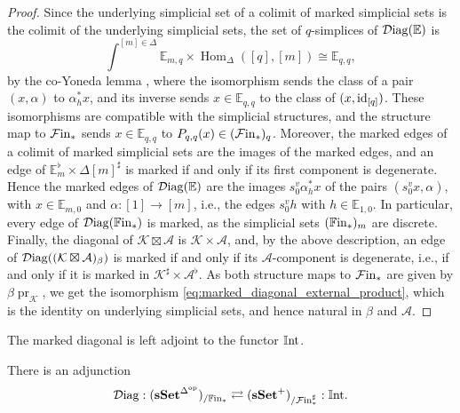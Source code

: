 \documentclass[10pt,reqno]{amsart}
\begin{document}
\begin{proof}
Since the underlying simplicial set of a colimit of marked simplicial
sets is the colimit of the underlying simplicial sets, the set of
$q$-simplices of $\mathcal{D}\mathrm{iag}(\mathbb E)$ is
\[
 \int^{[m]\in\Delta}\mathbb E_{m,q}
 \times\operatorname{Hom}_\Delta([q],[m])
 \cong\mathbb E_{q,q},
\]
by the co-Yoneda lemma
\cite[\S3.10, Equation~(3.71), p.~53]{Kelly2005}, where the isomorphism
sends the class of a pair $(x,\alpha)$ to $\alpha_h^*x$, and its
inverse sends $x\in\mathbb E_{q,q}$ to the class of
$(x,\operatorname{id}_{[q]})$. These isomorphisms are compatible with the
simplicial structures, and the structure map to $\mathcal{F}\mathrm{in}_*$ sends
$x\in\mathbb E_{q,q}$ to $P_{q,q}(x)\in (\mathcal{F}\mathrm{in}_*)_q$. Moreover, the
marked edges of a colimit of marked simplicial sets are the images of
the marked edges, and an edge of
$\mathbb E_m^\flat\times\Delta[m]^\sharp$ is marked if and only if
its first component is degenerate. Hence the marked edges of
$\mathcal{D}\mathrm{iag}(\mathbb E)$ are the images $s_0^v\alpha_h^*x$ of the pairs
$(s_0^v x,\alpha)$, with $x\in\mathbb E_{m,0}$ and
$\alpha:[1]\to[m]$, i.e., the edges $s_0^v h$ with
$h\in\mathbb E_{1,0}$. In particular, every edge of
$\mathcal{D}\mathrm{iag}(\mathbb{F}\mathrm{in}_*)$ is marked, as the simplicial sets
$(\mathbb{F}\mathrm{in}_*)_m$ are discrete. Finally, the diagonal of
$\mathcal K\boxtimes \mathcal A$ is $\mathcal K\times \mathcal A$,
and, by the above description, an edge of
$\mathcal{D}\mathrm{iag}((\mathcal K\boxtimes \mathcal A)_\beta)$ is marked if and only
if its $\mathcal A$-component is degenerate, i.e., if and only if it
is marked in $\mathcal K^\sharp\times \mathcal A^\flat$. As both
structure maps to $\mathcal{F}\mathrm{in}_*$ are given by
$\beta\operatorname{pr}_{\mathcal K}$, we get the isomorphism
\eqref{eq:marked_diagonal_external_product}, which is the identity on
underlying simplicial sets, and hence natural in $\beta$ and
$\mathcal A$.
\end{proof}

The marked diagonal is left adjoint to the functor $\mathbb{I}\mathrm{nt}$.

\begin{proposition}
\label{prop:marked_diagonal_adjunction}
There is an adjunction
\[
 \mathcal{D}\mathrm{iag}:(\mathbf{sSet}^{\Delta^{\mathrm{op}}})_{/\mathbb{F}\mathrm{in}_*}
 \rightleftarrows(\mathbf{sSet}^+)_{/\mathcal{F}\mathrm{in}_*^\sharp}:\mathbb{I}\mathrm{nt}.
\]
\end{proposition}
\end{document}
